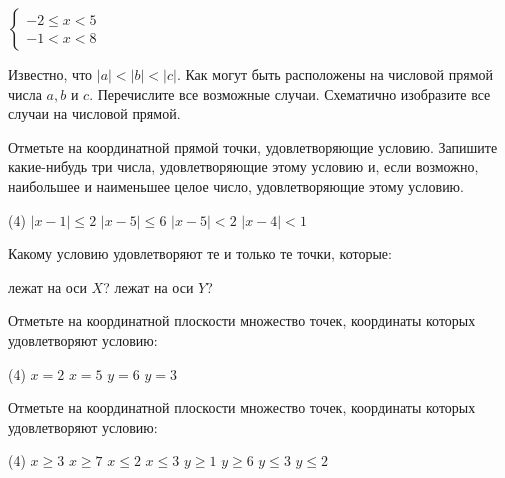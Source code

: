 \begin{class}[number=3-4]
\begin{listofex}
\begin{tasks}
			\task \( \begin{cases} -2 \le x < 5 \\ -1 < x < 8 \end{cases} \)
		\end{tasks}
		\item Известно, что \( |a|<|b|<|c| \). Как могут быть расположены на числовой прямой числа \(a, b\) и \(c\). Перечислите все возможные случаи. Схематично изобразите все случаи на числовой прямой.
		\item Отметьте на координатной прямой точки, удовлетворяющие условию. Запишите какие-нибудь три числа, удовлетворяющие этому условию и, если возможно, наибольшее и наименьшее целое число, удовлетворяющие этому условию.
		\begin{tasks}(4)
			\task \( |x-1| \le 2 \)
			\task \( |x-5| \le 6 \)
			\task \( |x-5| < 2 \)
			\task \( |x-4| < 1 \)
		\end{tasks}
		\item Какому условию удовлетворяют те и только те точки, которые:
		\begin{tasks}
			\task лежат на оси \(X\)?
			\task лежат на оси \(Y\)?
		\end{tasks}
		\item Отметьте на координатной плоскости множество точек, координаты которых удовлетворяют условию:
		\begin{tasks}(4)
			\task \( x=2 \)
			\task \( x=5 \)
			\task \( y=6 \)
			\task \( y=3 \)
		\end{tasks}
		\item Отметьте на координатной плоскости множество точек, координаты которых удовлетворяют условию:
		\begin{tasks}(4)
			\task \( x \ge 3 \)
			\task \( x \ge 7 \)
			\task \( x \le 2 \)
			\task \( x \le 3 \)
			\task \( y \ge 1 \)
			\task \( y \ge 6 \)
			\task \( y \le 3 \)
			\task \( y \le 2 \)
		\end{tasks}
	\end{listofex}
\end{class}

